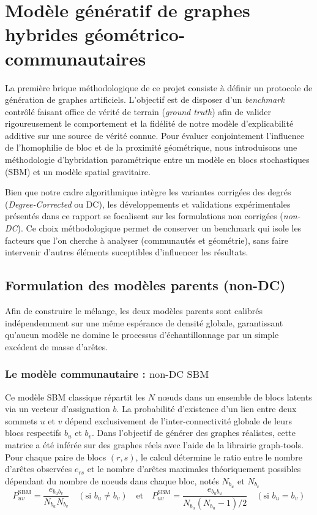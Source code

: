 \section{Modèle génératif de graphes hybrides géométrico-communautaires}
\label{sec:modele_hybride}

La première brique méthodologique de ce projet consiste à définir un protocole de génération de graphes artificiels. L'objectif est de disposer d'un \textit{benchmark} contrôlé faisant office de vérité de terrain (\textit{ground truth}) afin de valider rigoureusement le comportement et la fidélité de notre modèle d'explicabilité additive sur une source de vérité connue. Pour évaluer conjointement l'influence de l'homophilie de bloc et de la proximité géométrique, nous introduisons une méthodologie d'hybridation paramétrique entre un modèle en blocs stochastiques (SBM) et un modèle spatial gravitaire.

Bien que notre cadre algorithmique intègre les variantes corrigées des degrés (\textit{Degree-Corrected} ou DC), les développements et validations expérimentales présentés dans ce rapport se focalisent sur les formulations non corrigées (\textit{non-DC}). Ce choix méthodologique permet de conserver un benchmark qui isole les facteurs que l'on cherche à analyser (communautés et géométrie), sans faire intervenir d'autres éléments suceptibles d'influencer les résultats.


\subsection{Formulation des modèles parents (non-DC)}

Afin de construire le mélange, les deux modèles parents sont calibrés indépendemment sur une même espérance de densité globale, garantissant qu'aucun modèle ne domine le processus d'échantillonnage par un simple excédent de masse d'arêtes.

\subsubsection{Le modèle communautaire : $\text{non-DC SBM}$}
Ce modèle SBM classique répartit les $N$ nœuds dans un ensemble de blocs latents via un vecteur d'assignation $b$. La probabilité d'existence d'un lien entre deux sommets $u$ et $v$ dépend exclusivement de l'inter-connectivité globale de leurs blocs respectifs $b_u$ et $b_v$. Dans l'objectif de générer des graphes réalistes, cette matrice a été inférée sur des graphes réels avec l'aide de la librairie graph-tools. Pour chaque paire de blocs $(r, s)$, le calcul détermine le ratio entre le nombre d'arêtes observées $e_{rs}$ et le nombre d'arêtes maximales théoriquement possibles dépendant du nombre de noeuds dans chaque bloc, notés $N_{b_u}$ et $N_{b_v}$
\begin{equation}
    P^{\text{SBM}}_{uv} = \frac{e_{b_u b_v}}{N_{b_u} N_{b_v}} \quad (\text{si } b_u \neq b_v) \quad \text{et} \quad P^{\text{SBM}}_{uv} = \frac{e_{b_u b_u}}{N_{b_u}(N_{b_u}-1)/2} \quad (\text{si } b_u = b_v)
\end{equation}

